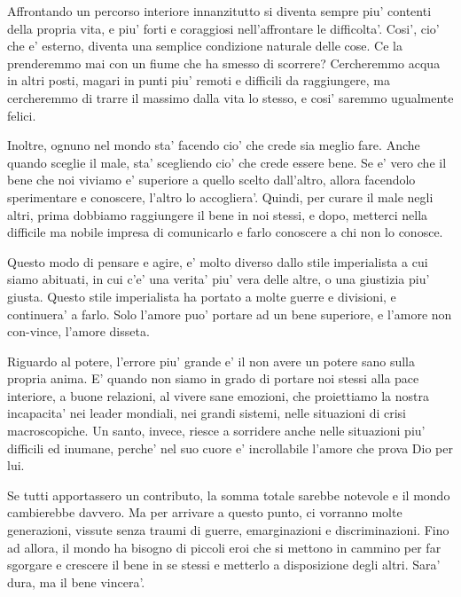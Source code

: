 Affrontando un percorso interiore innanzitutto si diventa sempre piu' contenti della propria vita, e piu' forti e coraggiosi nell'affrontare le difficolta'. Cosi', cio' che e' esterno, diventa una semplice condizione naturale delle cose. Ce la prenderemmo mai con un fiume che ha smesso di scorrere? Cercheremmo acqua in altri posti, magari in punti piu' remoti e difficili da raggiungere, ma cercheremmo di trarre il massimo dalla vita lo stesso, e cosi' saremmo ugualmente felici. 

Inoltre, ognuno nel mondo sta' facendo cio' che crede sia meglio fare. Anche quando sceglie il male, sta' scegliendo cio' che crede essere bene. Se e' vero che il bene che noi viviamo e' superiore a quello scelto dall'altro, allora facendolo sperimentare e conoscere, l'altro lo accogliera'.
Quindi, per curare il male negli altri, prima dobbiamo raggiungere il bene in noi stessi, e dopo, metterci nella difficile ma nobile impresa di comunicarlo e farlo conoscere a chi non lo conosce.

Questo modo di pensare e agire, e' molto diverso dallo stile imperialista a cui siamo abituati, in cui c'e' una verita' piu' vera delle altre, o una giustizia piu' giusta. Questo stile imperialista ha portato a molte guerre e divisioni, e continuera' a farlo. Solo l'amore puo' portare ad un bene superiore, e l'amore non con-vince, l'amore disseta.

Riguardo al potere, l'errore piu' grande e' il non avere un potere sano sulla propria anima. E' quando non siamo in grado di portare noi stessi alla pace interiore, a buone relazioni, al vivere sane emozioni, che proiettiamo la nostra incapacita' nei leader mondiali, nei grandi sistemi, nelle situazioni di crisi macroscopiche. Un santo, invece, riesce a sorridere anche nelle situazioni piu' difficili ed inumane, perche' nel suo cuore e' incrollabile l'amore che prova Dio per lui.

Se tutti apportassero un contributo, la somma totale sarebbe notevole e il mondo cambierebbe davvero. Ma per arrivare a questo punto, ci vorranno molte generazioni, vissute senza traumi di guerre, emarginazioni e discriminazioni. Fino ad allora, il mondo ha bisogno di piccoli eroi che si mettono in cammino per far sgorgare e crescere il bene in se stessi e metterlo a disposizione degli altri. Sara' dura, ma il bene vincera'.

